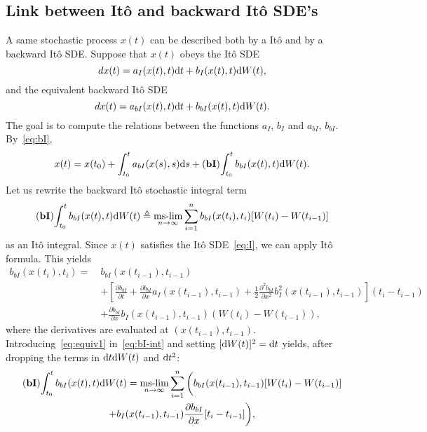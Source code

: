 \subsection{Link between Itô and backward Itô SDE's}
A same stochastic process $x(t)$ can be described both by a Itô and by a backward Itô SDE. Suppose that $x(t)$ obeys the Itô SDE
\begin{equation} \label{eq:I}
	dx(t) = a_I(x(t),t) \rm dt + b_I(x(t),t) \rm dW(t),
\end{equation}
and the equivalent backward Itô SDE
\begin{equation} \label{eq:bI}
	dx(t) = a_{bI}(x(t),t) \rm dt + b_{bI}(x(t),t) \rm dW(t). 
\end{equation}
The goal is to compute the relations between the functions $a_I$, $b_I$ and $a_{bI}$, $b_{bI}$. By~\eqref{eq:bI},
\begin{equation}
	x(t) = x(t_0) + \int_{t_0}^t a_{bI}(x(s),s) \rm ds + \bI \int_{t_0}^t b_{bI}(x(t),t) \rm dW(t).
\end{equation}
Let us rewrite the backward Itô stochastic integral term
\begin{equation} \label{eq:bI-int}
	\bI \int_{t_0}^t b_{bI}(x(t),t) \rm dW(t) \triangleq \mslim_{n\rightarrow \infty} \sum_{i=1}^n b_{bI}(x(t_{i}),t_{i}) [W(t_i)-W(t_{i-1})]
\end{equation}
as an Itô integral. Since $x(t)$ satisfies the Itô SDE~\eqref{eq:I}, we can apply Itô formula. This yields 
\begin{align} \label{eq:equiv1}
	b_{bI}(x(t_i),t_{i}) =~& b_{bI}(x(t_{i-1}),t_{i-1}) \nonumber\\
		&+ \left[\frac{\partial b_{bI}}{\partial t} + \frac{\partial b_{bI}}{\partial x} a_I(x(t_{i-1}),t_{i-1}) + \frac{1}{2}\frac{\partial^2 b_{bI}}{\partial x^2} b_I^2(x(t_{i-1}),t_{i-1})\right] (t_i - t_{i-1}) \nonumber\\
		&+ \frac{\partial b_{bI}}{\partial x}b_I(x(t_{i-1}),t_{i-1}) (W(t_i) - W(t_{i-1})),
\end{align}
where the derivatives are evaluated at $(x(t_{i-1}),t_{i-1})$. Introducing~\eqref{eq:equiv1} in~\eqref{eq:bI-int} and setting $[\rm dW(t)]^2 = \rm dt$ yields, after dropping the terms in $\rm dt \rm dW(t)$ and $\rm dt^2$:
\begin{multline}
	\bI \int_{t_0}^t b_{bI}(x(t),t) \rm dW(t) = \mslim_{n\rightarrow \infty} \sum_{i=1}^n \bigg( b_{bI}(x(t_{i-1}),t_{i-1}) [W(t_i)-W(t_{i-1})] \\
	+ b_I(x(t_{i-1}),t_{i-1}) \frac{\partial b_{bI}}{\partial x}[t_i - t_{i-1}]\bigg),
\end{multline}
